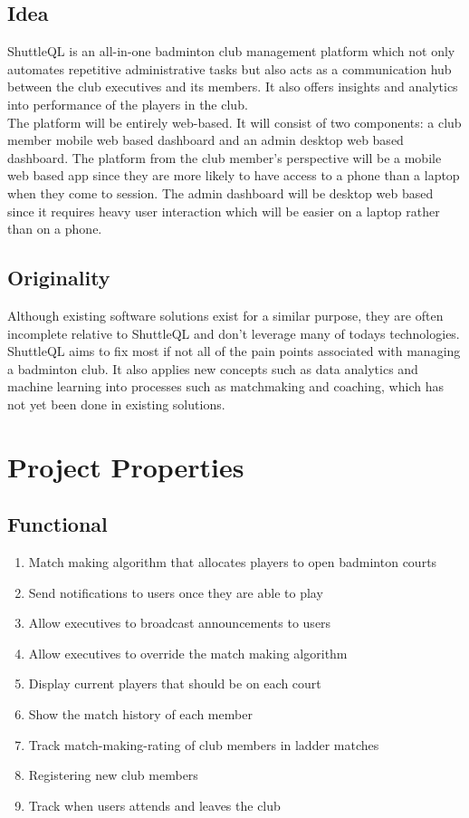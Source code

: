 \documentclass{article}
\begin{document}
\subsection{Idea}
ShuttleQL is an all-in-one badminton club management platform which not only
automates repetitive administrative tasks but also acts as a communication hub
between the club executives and its members. It also offers insights and
analytics into performance of the players in the club. \\

The platform will be entirely web-based. It will consist of two components:
a club member mobile web based dashboard and an admin desktop web based dashboard.
The platform from the club member's perspective will be a mobile web based app
since they are more likely to have access to a phone than a laptop when they
come to session. The admin dashboard will be desktop web based since it requires
heavy user interaction which will be easier on a laptop rather than on a phone.

\subsection{Originality}
Although existing software solutions exist for a similar purpose, they are often
incomplete relative to ShuttleQL and don't leverage many of todays technologies.
ShuttleQL aims to fix most if not all of the pain points associated with
managing a badminton club. It also applies new concepts such as data analytics and
machine learning into processes such as matchmaking and coaching, which has not
yet been done in existing solutions.

\newpage

\section{Project Properties}
\subsection{Functional}
\begin{enumerate}
  \item Match making algorithm that allocates players to open badminton courts
  \item Send notifications to users once they are able to play
  \item Allow executives to broadcast announcements to users
  \item Allow executives to override the match making algorithm
  \item Display current players that should be on each court
  \item Show the match history of each member
  \item Track match-making-rating of club members in ladder matches
  \item Registering new club members
  \item Track when users attends and leaves the club
\end{enumerate}
\end{document}
